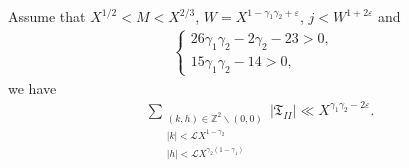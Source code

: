 \documentclass[10pt,a4paper]{amsart}
\newcommand{\ZZ}{\ensuremath{\mathbb{Z}}}
\newcommand{\cL}{\ensuremath{\mathcal{L}}}
\begin{document}
\begin{lemma}\label{lemma: Gamma II} Assume that $X^{1/2}<M<X^{2/3}$, $W=X^{1-\gamma_1\gamma_2+\varepsilon}$, $j<W^{1+2\varepsilon}$ and
	\begin{align}\label{eq: condition 3}
		\left\{\begin{array}{ll} 26\gamma_1\gamma_2-2\gamma_2-23>0, & \\
			15\gamma_1\gamma_2-14>0,
		\end{array}\right.
	\end{align}
	we have
	\begin{align*}
		\sum_{\substack{(k,h) \in \ZZ^2 \backslash (0,0) \\ |k|<\cL X^{1-\gamma_2} \\ |h|<\cL X^{\gamma_2(1-\gamma_1)}}}|\mathfrak{T}_{II}|\ll X^{\gamma_1\gamma_2-2\varepsilon}.
	\end{align*}
\end{lemma}
\end{document}
